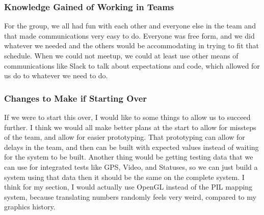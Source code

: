 \subsubsection{Knowledge Gained of Working in Teams}
For the group, we all had fun with each other and everyone else in the team and that made communications very easy to do.
Everyone was free form, and we did whatever we needed and the others would be accommodating in trying to fit that schedule.
When we could not meetup, we could at least use other means of communications like Slack to talk about expectations and code, which allowed for us do to whatever we need to do.
\subsubsection{Changes to Make if Starting Over}
If we were to start this over, I would like to some things to allow us to succeed further.
I think we would all make better plans at the start to allow for missteps of the team, and allow for easier prototyping.
That prototyping can allow for delays in the team, and then can be built with expected values instead of waiting for the system to be built.
Another thing would be getting testing data that we can use for integrated tests like GPS, Video, and Statuses, so we can just build a system using that data then it should be the same on the complete system.
I think for my section, I would actually use OpenGL instead of the PIL mapping system, because translating numbers randomly feels very weird, compared to my graphics history.